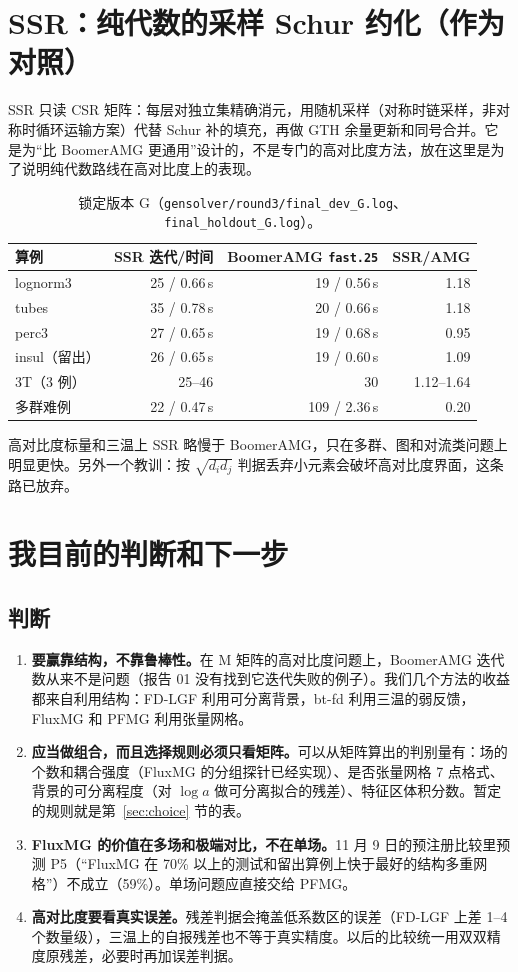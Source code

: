 \documentclass[11pt,a4paper]{ctexart}
\begin{document}
\section{SSR：纯代数的采样 Schur 约化（作为对照）}
SSR 只读 CSR 矩阵：每层对独立集精确消元，用随机采样（对称时链采样，非对称时循环运输方案）代替 Schur 补的填充，再做 GTH 余量更新和同号合并。它是为“比 BoomerAMG 更通用”设计的，不是专门的高对比度方法，放在这里是为了说明纯代数路线在高对比度上的表现。
\begin{table}[H]
\centering\small
\begin{tabular}{lrrr}
\toprule
算例 & SSR 迭代/时间 & BoomerAMG \texttt{fast.25} & SSR/AMG \\
\midrule
lognorm3 & 25 / 0.66\,s & 19 / 0.56\,s & 1.18 \\
tubes & 35 / 0.78\,s & 20 / 0.66\,s & 1.18 \\
perc3 & 27 / 0.65\,s & 19 / 0.68\,s & 0.95 \\
insul（留出） & 26 / 0.65\,s & 19 / 0.60\,s & 1.09 \\
3T（3 例） & 25--46 & 30 & 1.12--1.64 \\
多群难例 & 22 / 0.47\,s & 109 / 2.36\,s & 0.20 \\
\bottomrule
\end{tabular}
\caption{锁定版本 G（\texttt{gensolver/round3/final\_dev\_G.log}、\texttt{final\_holdout\_G.log}）。}
\end{table}
高对比度标量和三温上 SSR 略慢于 BoomerAMG，只在多群、图和对流类问题上明显更快。另外一个教训：按 $\sqrt{d_id_j}$ 判据丢弃小元素会破坏高对比度界面，这条路已放弃。

\section{我目前的判断和下一步}\label{sec:next}
\subsection{判断}
\begin{enumerate}
\item \textbf{要赢靠结构，不靠鲁棒性。}在 M 矩阵的高对比度问题上，BoomerAMG 迭代数从来不是问题（报告 01 没有找到它迭代失败的例子）。我们几个方法的收益都来自利用结构：FD-LGF 利用可分离背景，bt-fd 利用三温的弱反馈，FluxMG 和 PFMG 利用张量网格。
\item \textbf{应当做组合，而且选择规则必须只看矩阵。}可以从矩阵算出的判别量有：场的个数和耦合强度（FluxMG 的分组探针已经实现）、是否张量网格 7 点格式、背景的可分离程度（对 $\log a$ 做可分离拟合的残差）、特征区体积分数。暂定的规则就是第~\ref{sec:choice} 节的表。
\item \textbf{FluxMG 的价值在多场和极端对比，不在单场。}11 月 9 日的预注册比较里预测 P5（“FluxMG 在 70\% 以上的测试和留出算例上快于最好的结构多重网格”）不成立（59\%）。单场问题应直接交给 PFMG。
\item \textbf{高对比度要看真实误差。}残差判据会掩盖低系数区的误差（FD-LGF 上差 1--4 个数量级），三温上的自报残差也不等于真实精度。以后的比较统一用双双精度原残差，必要时再加误差判据。
\end{enumerate}
\end{document}
